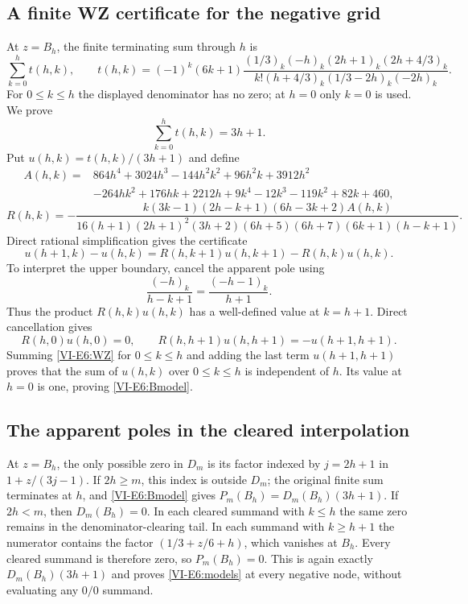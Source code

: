\documentclass[11pt,letterpaper]{article}
\numberwithin{equation}{section}
\begin{document}
\subsection{A finite WZ certificate for the negative grid}
At $z=B_h$, the finite terminating sum through $h$ is
\[
 \sum_{k=0}^{h} t(h,k),\qquad
 t(h,k)=(-1)^k(6k+1)
 \frac{(1/3)_k(-h)_k(2h+1)_k(2h+4/3)_k}
 {k!(h+4/3)_k(1/3-2h)_k(-2h)_k}.
\]
For $0\le k\le h$ the displayed denominator has no zero;
at $h=0$ only $k=0$ is used. We prove
\begin{equation}\label{VI-E6:Bmodel}
 \sum_{k=0}^{h}t(h,k)=3h+1.
\end{equation}
Put $u(h,k)=t(h,k)/(3h+1)$ and define
\[
 \begin{split}
 A(h,k)={}&864h^4+3024h^3-144h^2k^2+96h^2k+3912h^2\\
 &-264hk^2+176hk+2212h+9k^4-12k^3-119k^2+82k+460,
 \end{split}
\]
\[
 R(h,k)=
 -\frac{k(3k-1)(2h-k+1)(6h-3k+2)A(h,k)}
 {16(h+1)(2h+1)^2(3h+2)(6h+5)(6h+7)(6k+1)(h-k+1)}.
\]
Direct rational simplification gives the certificate
\begin{equation}\label{VI-E6:WZ}
 u(h+1,k)-u(h,k)
 =R(h,k+1)u(h,k+1)-R(h,k)u(h,k).
\end{equation}
To interpret the upper boundary, cancel the apparent pole using
\[
 \frac{(-h)_k}{h-k+1}=
 \frac{(-h-1)_k}{h+1}.
\]
Thus the product $R(h,k)u(h,k)$ has a well-defined value at
$k=h+1$. Direct cancellation gives
\[
 R(h,0)u(h,0)=0,\qquad
 R(h,h+1)u(h,h+1)=-u(h+1,h+1).
\]
Summing \eqref{VI-E6:WZ} for $0\le k\le h$ and adding the last term
$u(h+1,h+1)$ proves that the sum of $u(h,k)$ over $0\le k\le h$
is independent of $h$. Its value at $h=0$ is one, proving
\eqref{VI-E6:Bmodel}.

\subsection{The apparent poles in the cleared interpolation}
At $z=B_h$, the only possible zero in $D_m$ is its factor indexed
by $j=2h+1$ in $1+z/(3j-1)$.
If $2h\ge m$, this index is outside $D_m$; the original finite
sum terminates at $h$, and \eqref{VI-E6:Bmodel} gives
$P_m(B_h)=D_m(B_h)(3h+1)$.
If $2h<m$, then $D_m(B_h)=0$. In each cleared summand with
$k\le h$ the same zero remains in the denominator-clearing tail.
In each summand with $k\ge h+1$ the numerator contains the factor
$(1/3+z/6+h)$, which vanishes at $B_h$.
Every cleared summand is therefore zero, so $P_m(B_h)=0$.
This is again exactly $D_m(B_h)(3h+1)$ and proves
\eqref{VI-E6:models} at every negative node, without evaluating any
$0/0$ summand.
\end{document}
